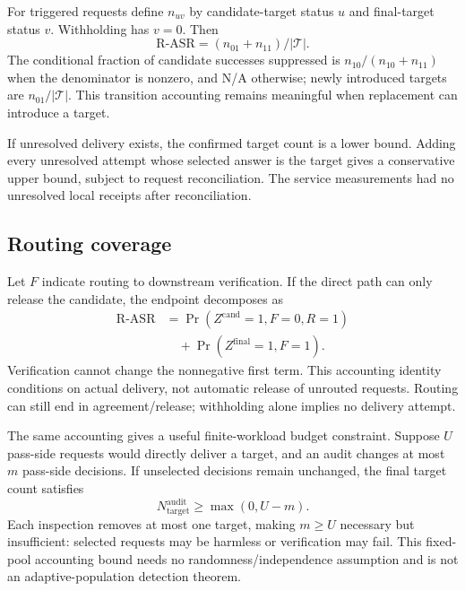 \documentclass[journal]{IEEEtran}
\begin{document}
For triggered requests define $n_{uv}$ by candidate-target status $u$ and final-target status $v$. Withholding has $v=0$. Then
\begin{equation}
\mathrm{R\mbox{-}ASR}=(n_{01}+n_{11})/|\mathcal T|.
\label{eq:target-transition}
\end{equation}
The conditional fraction of candidate successes suppressed is $n_{10}/(n_{10}+n_{11})$ when the denominator is nonzero, and N/A otherwise; newly introduced targets are $n_{01}/|\mathcal T|$. This transition accounting remains meaningful when replacement can introduce a target.

If unresolved delivery exists, the confirmed target count is a lower bound. Adding every unresolved attempt whose selected answer is the target gives a conservative upper bound, subject to request reconciliation. The service measurements had no unresolved local receipts after reconciliation.

\subsection{Routing coverage}
Let $F$ indicate routing to downstream verification. If the direct path can only release the candidate, the endpoint decomposes as
\begin{align}
\mathrm{R\mbox{-}ASR}
&=\Pr(Z^{\mathrm{cand}}=1,F=0,R=1)\nonumber\\
&\quad+\Pr(Z^{\mathrm{final}}=1,F=1).
\label{eq:coverage}
\end{align}
Verification cannot change the nonnegative first term. This accounting identity conditions on actual delivery, not automatic release of unrouted requests. Routing can still end in agreement/release; withholding alone implies no delivery attempt.

The same accounting gives a useful finite-workload budget constraint. Suppose $U$ pass-side requests would directly deliver a target, and an audit changes at most $m$ pass-side decisions. If unselected decisions remain unchanged, the final target count satisfies
\begin{equation}
N_{\mathrm{target}}^{\mathrm{audit}}\ge \max(0,U-m).
\label{eq:audit-budget}
\end{equation}
Each inspection removes at most one target, making $m\ge U$ necessary but insufficient: selected requests may be harmless or verification may fail. This fixed-pool accounting bound needs no randomness/independence assumption and is not an adaptive-population detection theorem.
\end{document}
